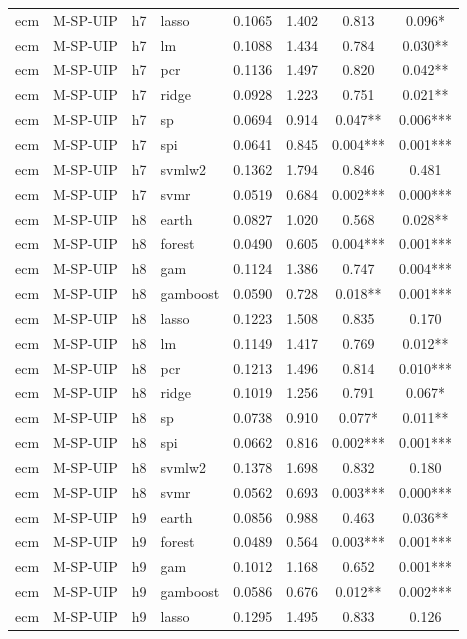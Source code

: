 \begin{ThreePartTable}
\begin{longtable}[t]{llclcccc}
ecm & M-SP-UIP & h7 & lasso & 0.1065 & 1.402 & 0.813 & 0.096*\\
ecm & M-SP-UIP & h7 & lm & 0.1088 & 1.434 & 0.784 & 0.030**\\
ecm & M-SP-UIP & h7 & pcr & 0.1136 & 1.497 & 0.820 & 0.042**\\
ecm & M-SP-UIP & h7 & ridge & 0.0928 & 1.223 & 0.751 & 0.021**\\
ecm & M-SP-UIP & h7 & sp & 0.0694 & 0.914 & 0.047** & 0.006***\\
ecm & M-SP-UIP & h7 & spi & 0.0641 & 0.845 & 0.004*** & 0.001***\\
ecm & M-SP-UIP & h7 & svmlw2 & 0.1362 & 1.794 & 0.846 & 0.481\\
ecm & M-SP-UIP & h7 & svmr & 0.0519 & 0.684 & 0.002*** & 0.000***\\
\addlinespace
ecm & M-SP-UIP & h8 & earth & 0.0827 & 1.020 & 0.568 & 0.028**\\
ecm & M-SP-UIP & h8 & forest & 0.0490 & 0.605 & 0.004*** & 0.001***\\
ecm & M-SP-UIP & h8 & gam & 0.1124 & 1.386 & 0.747 & 0.004***\\
ecm & M-SP-UIP & h8 & gamboost & 0.0590 & 0.728 & 0.018** & 0.001***\\
ecm & M-SP-UIP & h8 & lasso & 0.1223 & 1.508 & 0.835 & 0.170\\
ecm & M-SP-UIP & h8 & lm & 0.1149 & 1.417 & 0.769 & 0.012**\\
ecm & M-SP-UIP & h8 & pcr & 0.1213 & 1.496 & 0.814 & 0.010***\\
ecm & M-SP-UIP & h8 & ridge & 0.1019 & 1.256 & 0.791 & 0.067*\\
ecm & M-SP-UIP & h8 & sp & 0.0738 & 0.910 & 0.077* & 0.011**\\
ecm & M-SP-UIP & h8 & spi & 0.0662 & 0.816 & 0.002*** & 0.001***\\
ecm & M-SP-UIP & h8 & svmlw2 & 0.1378 & 1.698 & 0.832 & 0.180\\
ecm & M-SP-UIP & h8 & svmr & 0.0562 & 0.693 & 0.003*** & 0.000***\\
\addlinespace
ecm & M-SP-UIP & h9 & earth & 0.0856 & 0.988 & 0.463 & 0.036**\\
ecm & M-SP-UIP & h9 & forest & 0.0489 & 0.564 & 0.003*** & 0.001***\\
ecm & M-SP-UIP & h9 & gam & 0.1012 & 1.168 & 0.652 & 0.001***\\
ecm & M-SP-UIP & h9 & gamboost & 0.0586 & 0.676 & 0.012** & 0.002***\\
ecm & M-SP-UIP & h9 & lasso & 0.1295 & 1.495 & 0.833 & 0.126\\

\end{longtable}
\end{ThreePartTable}
